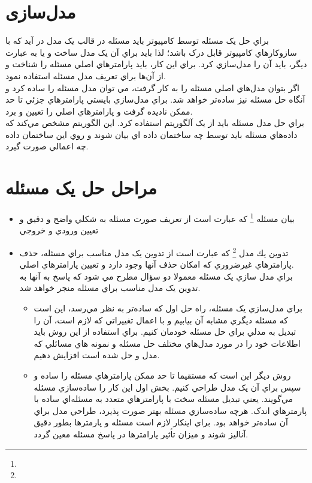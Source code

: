\documentclass{book}
\begin{document}
\section*{مدل‌سازی}
براي حل يک مسئله توسط کامپيوتر بايد مسئله در قالب يک مدل در آيد که با سازوکارهاي کامپيوتر قابل درک باشد؛ لذا بايد براي آن يک مدل ساخت و يا به عبارت ديگر، بايد آن‌ را مدل‌سازي کرد. براي اين کار، بايد پارامترهاي اصلي مسئله را شناخت و از آن‌ها براي تعريف مدل‌ مسئله استفاده نمود.\\
اگر بتوان مدل‌هاي اصلي مسئله را به کار گرفت، مي توان مدل مسئله را ساده کرد و آنگاه حل مسئله نيز ساده‌تر خواهد شد. براي مدل‌سازي بايستي پارامترهاي جزئي تا حد ممکن ناديده گرفت و پارامترهاي اصلي را تعيين و برد.\\
براي حل مدل مسئله بايد از يک آلگوريتم استفاده کرد. اين الگوريتم مشخص مي‌کند که داده‌هاي مسئله بايد توسط چه ساختمان داده اي بيان شوند و روي اين ساختمان داده چه اعمالي صورت گيرد.
\section*{مراحل حل یک مسئله}
\begin{itemize}
	\item
	بيان مسئله 
	\footnote{}
	که عبارت است از تعريف صورت مسئله به شکلي واضح و دقيق و تعيين ورودي و خروجي
	\item 
	تدوين يك مدل
		\footnote{}
	 که عبارت است از تدوين يک مدل مناسب براي مسئله، حذف پارامترهاي غيرضروري که امکان حذف آنها وجود دارد و تعيين پارامترهاي اصلي.\\
	 
	 براي مدل سازي يک مسئله معمولا دو سؤال مطرح مي شود که پاسخ به آنها به تدوين يک مدل مناسب براي مسئله منجر خواهد شد.
	 \begin{itemize}
			\item 
			براي مدل‌سازي يک مسئله، راه حل اول که ساده‌تر به نظر مي‌رسد، اين است که مسئله ديگري مشابه آن بيابيم و با اعمال تغييراتي که لازم است، آن‌ را تبديل به مدلي براي حل مسئله خودمان کنيم. براي استفاده از اين روش بايد اطلاعات خود را در مورد مدل‌هاي مختلف حل مسئله و نمونه هاي مسائلي که مدل و حل شده است افزايش دهيم.
			\item 
			روش ديگر اين است که مستقيما تا حد ممکن پارامترهاي مسئله را ساده و سپس براي آن يک مدل طراحي کنيم.  بخش اول اين کار را ساده‌سازي مسئله مي‌گويند. يعني تبديل مسئله سخت با پارامترهاي متعدد به مسئله‌اي ساده با پارمترهاي اندک. هرچه ساده‌سازي مسئله بهتر صورت پذيرد، طراحي مدل براي آن ساده‌تر خواهد بود. براي اينکار لازم است مسئله و پارمترها بطور دقيق آناليز شوند و ميزان  تأثير پارامترها در پاسخ مسئله معين گردد.
	 \end{itemize}
\end{itemize}
\end{document}

